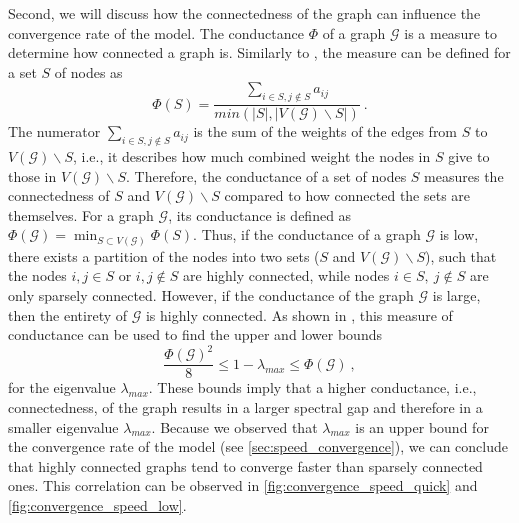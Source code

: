 \documentclass[journal,compsoc,10pt]{IEEEtran}
\newcommand{\NN}{\mathbb{N}}
\newcommand{\gG}{\mathcal{G}}
\renewcommand{\vec}[1]{\bm{#1}}        %
\newcommand{\mat}[1]{\bm{#1}}          %
\newtheorem{lemma}{Lemma}[section]
\newtheorem{definition}{Definition}[section]
\begin{document}
Second, we will discuss how the connectedness of the graph can influence the convergence rate of the model. The conductance $\Phi$ of a graph $\gG$ is a measure to determine how connected a graph is. Similarly to \cite{lovasz1993random}, the measure can be defined for a set $S$ of nodes as
\[\Phi(S) = \frac{\sum_{i\in S,j\notin S}a_{ij}}{min(|S|,|V(\gG)\backslash S|)}\ .\]
The numerator $\sum_{i\in S,j\notin S}a_{ij}$ is the sum of the weights of the edges from $S$ to $V(\gG)\backslash S$, i.e., it describes how much combined weight the nodes in $S$ give to those in $V(\gG)\backslash S$. Therefore, the conductance of a set of nodes $S$ measures the connectedness of $S$ and $V(\gG)\backslash S$ compared to how connected the sets are themselves. For a graph $\gG$, its conductance is defined as $\Phi(\gG) = \min_{S\subset V(\gG)}\Phi(S)$. Thus, if the conductance of a graph $\gG$ is low, there exists a partition of the nodes into two sets ($S$ and $V(\gG)\backslash S$), such that the nodes $i,j \in S$ or $i,j \notin S$ are highly connected, while nodes $i\in S,\ j\notin  S$ are only sparsely connected. However, if the conductance of the graph $\gG$ is large, then the entirety of $\gG$ is highly connected. As shown in \cite{lovasz1993random}, this measure of conductance can be used to find the upper and lower bounds
\[\frac{\Phi(\gG)^2}{8}\leq 1-\lambda_{max} \leq \Phi(\gG)\ ,\]
for the eigenvalue $\lambda_{max}$. These bounds imply that a higher conductance, i.e., connectedness, of the graph results in a larger spectral gap and therefore in a smaller eigenvalue $\lambda_{max}$. Because we observed that $\lambda_{max}$ is an upper bound for the convergence rate of the model (see \cref{sec:speed_convergence}), we can conclude that highly connected graphs tend to converge faster than sparsely connected ones. This correlation can be observed in \cref{fig:convergence_speed_quick} and \cref{fig:convergence_speed_low}.



\end{document}
